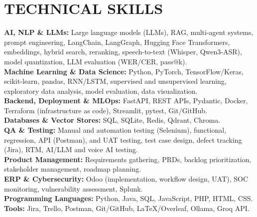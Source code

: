 \documentclass[10pt]{article}
\begin{document}
\section{TECHNICAL SKILLS}
\textbf{AI, NLP \& LLMs:} Large language models (LLMs), RAG, multi-agent systems, prompt engineering, LangChain, LangGraph, Hugging Face Transformers, embeddings, hybrid search, reranking, speech-to-text (Whisper, Qwen3-ASR), model quantization, LLM evaluation (WER/CER, pass@k).\\
\textbf{Machine Learning \& Data Science:} Python, PyTorch, TensorFlow/Keras, scikit-learn, pandas, RNN/LSTM, supervised and unsupervised learning, exploratory data analysis, model evaluation, data visualization.\\
\textbf{Backend, Deployment \& MLOps:} FastAPI, REST APIs, Pydantic, Docker, Terraform (infrastructure as code), Streamlit, pytest, Git/GitHub.\\
\textbf{Databases \& Vector Stores:} SQL, SQLite, Redis, Qdrant, Chroma.\\
\textbf{QA \& Testing:} Manual and automation testing (Selenium), functional, regression, API (Postman), and UAT testing, test case design, defect tracking (Jira), RTM, AI/LLM and voice AI testing.\\
\textbf{Product Management:} Requirements gathering, PRDs, backlog prioritization, stakeholder management, roadmap planning.\\
\textbf{ERP \& Cybersecurity:} Odoo (implementation, workflow design, UAT), SOC monitoring, vulnerability assessment, Splunk.\\
\textbf{Programming Languages:} Python, Java, SQL, JavaScript, PHP, HTML, CSS.\\
\textbf{Tools:} Jira, Trello, Postman, Git/GitHub, LaTeX/Overleaf, Ollama, Groq API.
\end{document}
